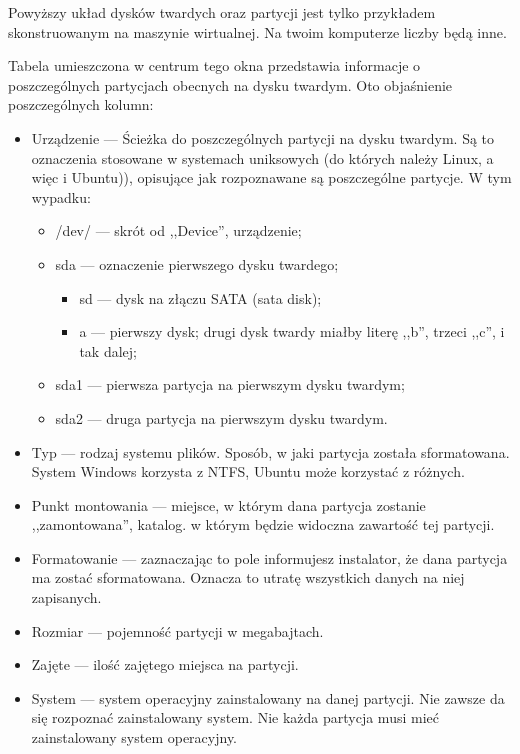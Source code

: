 Powyższy układ dysków twardych oraz partycji jest tylko przykładem skonstruowanym na maszynie wirtualnej. Na twoim komputerze liczby będą inne.

Tabela umieszczona w centrum tego okna przedstawia informacje o poszczególnych partycjach obecnych na dysku twardym. Oto objaśnienie poszczególnych kolumn:
\begin{itemize}
\item \textcolor{ubuntu_orange}{Urządzenie} --- Ścieżka do poszczególnych partycji na dysku twardym. Są to oznaczenia stosowane w systemach uniksowych (do których należy Linux, a więc i Ubuntu)), opisujące jak rozpoznawane są poszczególne partycje. W tym wypadku:
        \begin{itemize}
        \item \textcolor{ubuntu_orange}{/dev/} --- skrót od ,,Device'', urządzenie;
        \item \textcolor{ubuntu_orange}{sda} --- oznaczenie pierwszego dysku twardego;
                \begin{itemize}
                        \item \textcolor{ubuntu_orange}{sd} --- dysk na złączu SATA (sata disk);
                        \item \textcolor{ubuntu_orange}{a} --- pierwszy dysk; drugi dysk twardy miałby literę ,,b'', trzeci ,,c'', i tak dalej;
                \end{itemize}
        \item \textcolor{ubuntu_orange}{sda1} --- pierwsza partycja na pierwszym dysku twardym;
        \item \textcolor{ubuntu_orange}{sda2} --- druga partycja na pierwszym dysku twardym.
        \end{itemize}
\item \textcolor{ubuntu_orange}{Typ} --- rodzaj systemu plików. Sposób, w jaki partycja została sformatowana. System Windows korzysta z NTFS, Ubuntu może korzystać z różnych.
\item \textcolor{ubuntu_orange}{Punkt montowania} --- miejsce, w którym dana partycja zostanie ,,zamontowana'', katalog. w którym będzie widoczna zawartość tej partycji.
\item \textcolor{ubuntu_orange}{Formatowanie} --- zaznaczając to pole informujesz instalator, że dana partycja ma zostać sformatowana. Oznacza to utratę wszystkich danych na niej zapisanych.
\item \textcolor{ubuntu_orange}{Rozmiar} --- pojemność partycji w megabajtach.
\item \textcolor{ubuntu_orange}{Zajęte} --- ilość zajętego miejsca na partycji.
\item \textcolor{ubuntu_orange}{System} --- system operacyjny zainstalowany na danej partycji. Nie zawsze da się rozpoznać zainstalowany system. Nie każda partycja musi mieć zainstalowany system operacyjny. 
\end{itemize}

